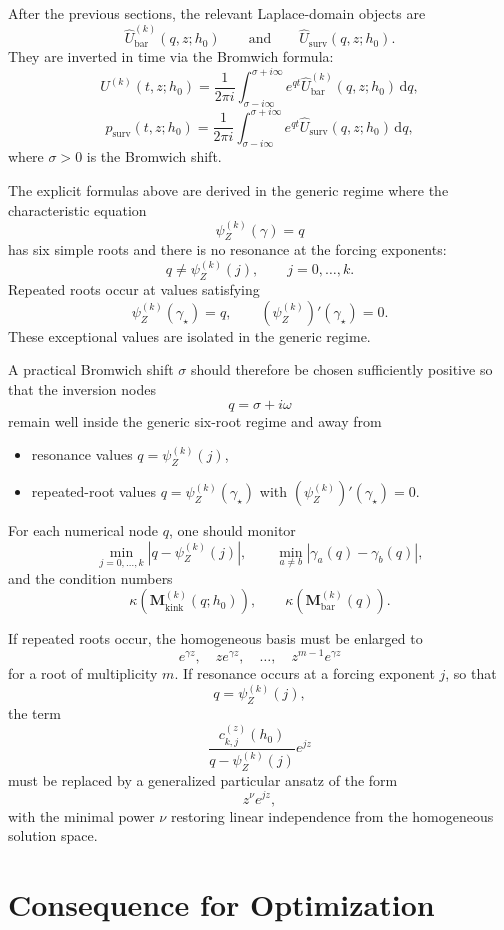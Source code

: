 \documentclass{article}
\newcommand{\diff}{\mathrm{d}}
\theoremstyle{definition}
\begin{document}
After the previous sections, the relevant Laplace-domain objects are
\[
\widehat U_{\mathrm{bar}}^{(k)}(q,z;h_0)
\qquad\text{and}\qquad
\widehat U_{\mathrm{surv}}(q,z;h_0).
\]
They are inverted in time via the Bromwich formula:
\[
U^{(k)}(t,z;h_0)
=
\frac{1}{2\pi i}
\int_{\sigma-i\infty}^{\sigma+i\infty}
e^{qt}\widehat U_{\mathrm{bar}}^{(k)}(q,z;h_0)\,\diff q,
\]
\[
p_{\mathrm{surv}}(t,z;h_0)
=
\frac{1}{2\pi i}
\int_{\sigma-i\infty}^{\sigma+i\infty}
e^{qt}\widehat U_{\mathrm{surv}}(q,z;h_0)\,\diff q,
\]
where $\sigma>0$ is the Bromwich shift.

The explicit formulas above are derived in the generic regime where the characteristic equation
\[
\psi_Z^{(k)}(\gamma)=q
\]
has six simple roots and there is no resonance at the forcing exponents:
\[
q\neq \psi_Z^{(k)}(j),\qquad j=0,\dots,k.
\]
Repeated roots occur at values satisfying
\[
\psi_Z^{(k)}(\gamma_\star)=q,
\qquad
(\psi_Z^{(k)})'(\gamma_\star)=0.
\]
These exceptional values are isolated in the generic regime.

A practical Bromwich shift $\sigma$ should therefore be chosen sufficiently positive so that the inversion nodes
\[
q=\sigma+i\omega
\]
remain well inside the generic six-root regime and away from
\begin{itemize}[leftmargin=2em]
\item resonance values $q=\psi_Z^{(k)}(j)$,
\item repeated-root values $q=\psi_Z^{(k)}(\gamma_\star)$ with $(\psi_Z^{(k)})'(\gamma_\star)=0$.
\end{itemize}

For each numerical node $q$, one should monitor
\[
\min_{j=0,\dots,k}|q-\psi_Z^{(k)}(j)|,
\qquad
\min_{a\neq b}|\gamma_a(q)-\gamma_b(q)|,
\]
and the condition numbers
\[
\kappa\!\left(\mathbf M_{\mathrm{kink}}^{(k)}(q;h_0)\right),
\qquad
\kappa\!\left(\mathbf M_{\mathrm{bar}}^{(k)}(q)\right).
\]

If repeated roots occur, the homogeneous basis must be enlarged to
\[
e^{\gamma z},\quad z e^{\gamma z},\quad \dots,\quad z^{m-1}e^{\gamma z}
\]
for a root of multiplicity $m$. If resonance occurs at a forcing exponent $j$, so that
\[
q=\psi_Z^{(k)}(j),
\]
the term
\[
\frac{c_{k,j}^{(z)}(h_0)}{q-\psi_Z^{(k)}(j)}e^{jz}
\]
must be replaced by a generalized particular ansatz of the form
\[
z^\nu e^{jz},
\]
with the minimal power $\nu$ restoring linear independence from the homogeneous solution space.

\section{Consequence for Optimization}
\end{document}
